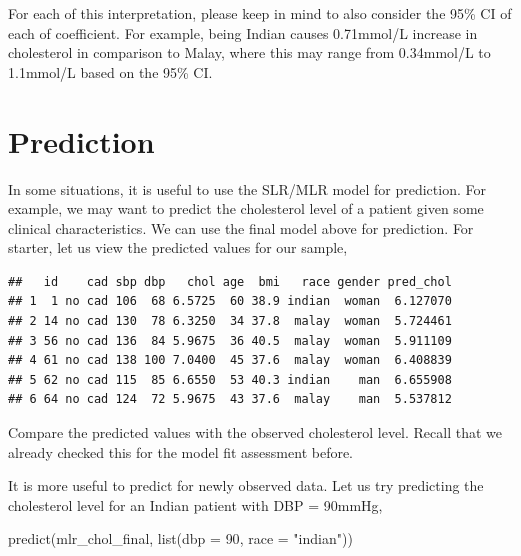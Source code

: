 \documentclass[
  10pt,
]{krantz}
\newenvironment{Shaded}{\begin{snugshade}}{\end{snugshade}}
\newcommand{\AttributeTok}[1]{\textcolor[rgb]{0.77,0.63,0.00}{#1}}
\newcommand{\DecValTok}[1]{\textcolor[rgb]{0.00,0.00,0.81}{#1}}
\newcommand{\FunctionTok}[1]{\textcolor[rgb]{0.00,0.00,0.00}{#1}}
\newcommand{\NormalTok}[1]{#1}
\newcommand{\OtherTok}[1]{\textcolor[rgb]{0.56,0.35,0.01}{#1}}
\newcommand{\SpecialCharTok}[1]{\textcolor[rgb]{0.00,0.00,0.00}{#1}}
\newcommand{\StringTok}[1]{\textcolor[rgb]{0.31,0.60,0.02}{#1}}
\begin{document}
For each of this interpretation, please keep in mind to also consider the 95\% CI of each of coefficient. For example, being Indian causes 0.71mmol/L increase in cholesterol in comparison to Malay, where this may range from 0.34mmol/L to 1.1mmol/L based on the 95\% CI.

\hypertarget{prediction}{%
\section{Prediction}\label{prediction}}

In some situations, it is useful to use the SLR/MLR model for prediction. For example, we may want to predict the cholesterol level of a patient given some clinical characteristics. We can use the final model above for prediction. For starter, let us view the predicted values for our sample,

\begin{Shaded}
\end{Shaded}

\begin{verbatim}
##   id    cad sbp dbp   chol age  bmi   race gender pred_chol
## 1  1 no cad 106  68 6.5725  60 38.9 indian  woman  6.127070
## 2 14 no cad 130  78 6.3250  34 37.8  malay  woman  5.724461
## 3 56 no cad 136  84 5.9675  36 40.5  malay  woman  5.911109
## 4 61 no cad 138 100 7.0400  45 37.6  malay  woman  6.408839
## 5 62 no cad 115  85 6.6550  53 40.3 indian    man  6.655908
## 6 64 no cad 124  72 5.9675  43 37.6  malay    man  5.537812
\end{verbatim}

Compare the predicted values with the observed cholesterol level. Recall that we already checked this for the model fit assessment before.

It is more useful to predict for newly observed data. Let us try predicting the cholesterol level for an Indian patient with DBP = 90mmHg,

\begin{Shaded}
\begin{Highlighting}[]
\FunctionTok{predict}\NormalTok{(mlr\_chol\_final, }\FunctionTok{list}\NormalTok{(}\AttributeTok{dbp =} \DecValTok{90}\NormalTok{, }\AttributeTok{race =} \StringTok{"indian"}\NormalTok{))}
\end{Highlighting}
\end{Shaded}
\end{document}
